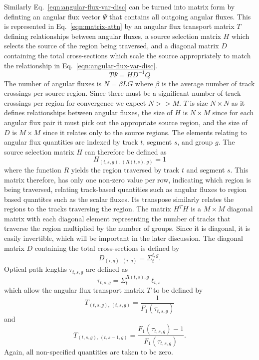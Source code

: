 Similarly Eq.~\ref{eqn:angular-flux-var-disc} can be turned into matrix form by definting an angular flux vector $\Psi$ that contains all outgoing angular fluxes. This is represented in Eq.~\ref{eqn:matrix-attn} by an angular flux transport matrix $T$ defining relationships between angular fluxes, a source selection matrix $H$ which selects the source of the region being traversed, and a diagonal matrix $D$ containing the total cross-sections which scale the source appropriately to match the relationship in Eq.~\ref{eqn:angular-flux-var-disc}.
\begin{equation}
T \Psi = H D^{-1} Q
\label{eqn:matrix-attn}
\end{equation}
The number of angular fluxes is $N = \beta L G$ where $\beta$ is the average number of track crossings per source region. Since there must be a significant number of track crossings per region for convergence we expect $N >> M$. $T$ is size $N \times N$ as it defines relationships between angular fluxes, the size of $H$ is $N \times M$ since for each angular flux pair it must pick out the appropriate source region, and the size of $D$ is $M \times M$ since it relates only to the source regions. The elements relating to angular flux quantities are indexed by track $t$, segment $s$, and group $g$. The source selection matrix $H$ can therefore be defined as
\begin{equation}
H_{\left(t,s,g\right), \, \left(R(t,s), g\right)} = 1
\end{equation}
where the function $R$ yields the region traversed by track $t$ and segment $s$. This matrix therefore, has only one non-zero value per row, indicating which region is being traversed, relating track-based quantities such as angular fluxes to region based quantites such as the scalar fluxes. Its transpose similarly relates the regions to the tracks traversing the region. The matrix $H^T H$ is a $M \times M$ diagonal matrix with each diagonal element representing the number of tracks that traverse the region multiplied by the number of groups. Since it is diagonal, it is easily invertible, which will be important in the later discussion.
The diagonal matrix $D$ containing the total cross-sections is defined by
\begin{equation}
D_{\left(i, g\right), \, \left(i, g\right)} = \Sigma_t^{i,g}.
\end{equation}
Optical path lengths $\tau_{t,s,g}$ are defined as
\begin{equation}
\tau_{t,s,g} = \Sigma_{t}^{R(t,s),g} \ell_{t,s}
\end{equation}
which allow the angular flux transport matrix $T$ to be defined by
\begin{equation}
T_{\left(t,s,g\right), \, \left(t, s, g\right)} = \frac{1}{F_1(\tau_{t,s,g})}
\end{equation}
and
\begin{equation}
T_{\left(t,s,g\right), \, \left(t, s-1, g\right)} = \frac{F_1(\tau_{t,s,g}) - 1}{F_1(\tau_{t,s,g})}.
\end{equation}
Again, all non-specified quantities are taken to be zero.

